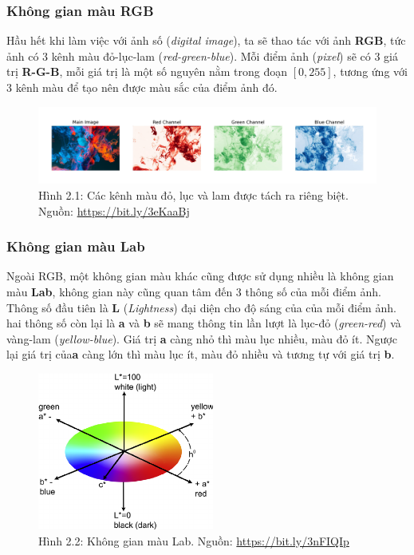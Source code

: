 \documentclass[a4paper]{article}
\begin{document}
\subsubsection{Không gian màu RGB}
Hầu hết khi làm việc với ảnh số (\textit{digital image}), ta sẽ thao tác với ảnh \textbf{RGB}, tức ảnh có 3 kênh màu đỏ-lục-lam (\textit{red-green-blue}). Mỗi điểm ảnh (\textit{pixel}) sẽ có 3 giá trị \textbf{R-G-B}, mỗi giá trị là một số nguyên nằm trong đoạn $[0, 255]$, tương ứng với 3 kênh màu để tạo nên được màu sắc của điểm ảnh đó.

\begin{figure}[h!]
\centering
\includegraphics[width=16.1cm]{images/2_1.jpeg}
\caption{Hình 2.1: Các kênh màu đỏ, lục và lam được tách ra riêng biệt. Nguồn: \href{https://bit.ly/3eKaaBj}{https://bit.ly/3eKaaBj}}
\end{figure}

\subsubsection{Không gian màu Lab}
Ngoài RGB, một không gian màu khác cũng được sử dụng nhiều là không gian màu \textbf{Lab}, không gian này cũng quan tâm đến 3 thông số của mỗi điểm ảnh. Thông số đầu tiên là \textbf{L} (\textit{Lightness}) đại diện cho độ sáng của của mỗi điểm ảnh. hai thông số còn lại là \textbf{a} và \textbf{b} sẽ mang thông tin lần lượt là lục-đỏ (\textit{green-red}) và vàng-lam (\textit{yellow-blue}). Giá trị \textbf{a} càng nhỏ thì màu lục nhiều, màu đỏ ít. Ngược lại giá trị của\textbf{a} càng lớn thì màu lục ít, màu đỏ nhiều và tương tự với giá trị \textbf{b}.

\begin{figure}[h!]
\centering
\includegraphics[width=5.8cm]{images/2_2.png}
\caption{Hình 2.2: Không gian màu Lab. Nguồn: \href{https://bit.ly/3nFIQIp}{https://bit.ly/3nFIQIp}}
\end{figure}
\end{document}
